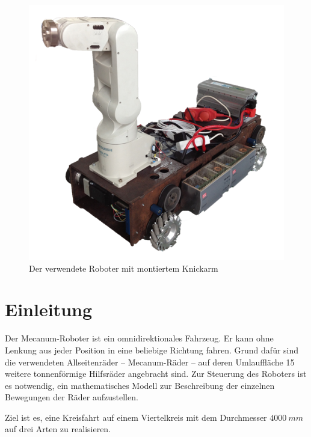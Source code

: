 \begin{figure}
    \centering
    \includegraphics[width=.9\textwidth]{Abbildungen/Roboter}
    \caption{Der verwendete Roboter mit montiertem Knickarm}
\end{figure}
\newpage

\section{Einleitung}
Der Mecanum-Roboter ist ein omnidirektionales Fahrzeug. Er kann ohne Lenkung aus jeder Position in eine beliebige Richtung fahren. Grund dafür sind die verwendeten Allseitenräder -- Mecanum-Räder -- auf deren Umlauffläche 15 weitere tonnenförmige Hilfsräder angebracht sind. Zur Steuerung des Roboters ist es notwendig, ein mathematisches Modell zur Beschreibung der einzelnen Bewegungen der Räder aufzustellen.

Ziel ist es, eine Kreisfahrt auf einem Viertelkreis mit dem Durchmesser $4000~mm$ auf drei Arten zu realisieren.

